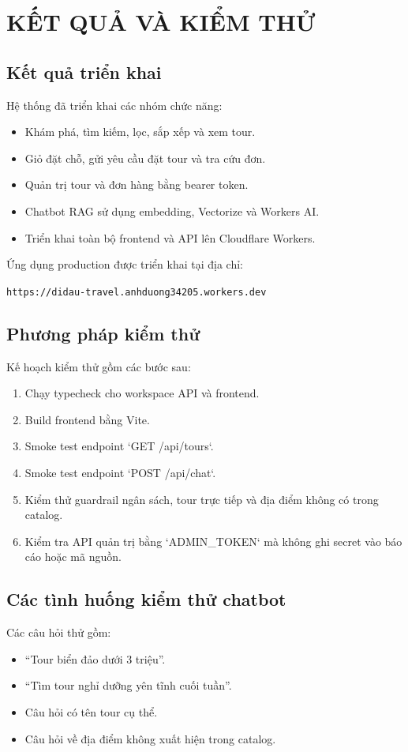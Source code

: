 \setcounter{chapter}{3}
\setcounter{table}{0}
\setcounter{figure}{0}
\chapter{KẾT QUẢ VÀ KIỂM THỬ}

\section{Kết quả triển khai}
Hệ thống đã triển khai các nhóm chức năng:
\begin{itemize}
    \item Khám phá, tìm kiếm, lọc, sắp xếp và xem tour.
    \item Giỏ đặt chỗ, gửi yêu cầu đặt tour và tra cứu đơn.
    \item Quản trị tour và đơn hàng bằng bearer token.
    \item Chatbot RAG sử dụng embedding, Vectorize và Workers AI.
    \item Triển khai toàn bộ frontend và API lên Cloudflare Workers.
\end{itemize}

Ứng dụng production được triển khai tại địa chỉ:

\begin{center}
\texttt{https://didau-travel.anhduong34205.workers.dev}
\end{center}

\section{Phương pháp kiểm thử}
Kế hoạch kiểm thử gồm các bước sau:
\begin{enumerate}
    \item Chạy typecheck cho workspace API và frontend.
    \item Build frontend bằng Vite.
    \item Smoke test endpoint `GET /api/tours`.
    \item Smoke test endpoint `POST /api/chat`.
    \item Kiểm thử guardrail ngân sách, tour trực tiếp và địa điểm không có trong catalog.
    \item Kiểm tra API quản trị bằng `ADMIN_TOKEN` mà không ghi secret vào báo cáo hoặc mã nguồn.
\end{enumerate}

\section{Các tình huống kiểm thử chatbot}
Các câu hỏi thử gồm:
\begin{itemize}
    \item ``Tour biển đảo dưới 3 triệu''.
    \item ``Tìm tour nghỉ dưỡng yên tĩnh cuối tuần''.
    \item Câu hỏi có tên tour cụ thể.
    \item Câu hỏi về địa điểm không xuất hiện trong catalog.
\end{itemize}

